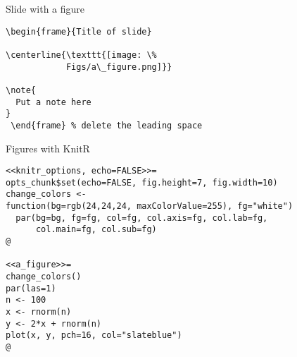 \documentclass[12pt,t]{beamer}
\begin{document}
\begin{frame}[c,fragile]{Slide with a figure}
\addtocounter{framenumber}{-1}

\begin{lstlisting}
\begin{frame}{Title of slide}

\centerline{\texttt{[image: \%
            Figs/a\_figure.png]}}

\note{
  Put a note here
}
 \end{frame} % delete the leading space
\end{lstlisting}

\end{frame}



\begin{frame}[c,fragile]{Figures with KnitR}

\begin{lstlisting}
<<knitr_options, echo=FALSE>>=
opts_chunk$set(echo=FALSE, fig.height=7, fig.width=10)
change_colors <-
function(bg=rgb(24,24,24, maxColorValue=255), fg="white")
  par(bg=bg, fg=fg, col=fg, col.axis=fg, col.lab=fg,
      col.main=fg, col.sub=fg)
@

<<a_figure>>=
change_colors()
par(las=1)
n <- 100
x <- rnorm(n)
y <- 2*x + rnorm(n)
plot(x, y, pch=16, col="slateblue")
@
\end{lstlisting}

\end{frame}
\end{document}
